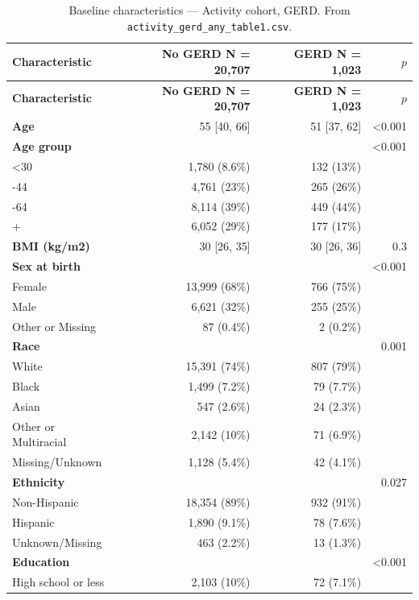 \documentclass[11pt]{article}
\newcommand{\code}[1]{\texttt{\small #1}}
\begin{document}
\footnotesize\begin{longtable}{@{}p{6.4cm}rrr@{}}
\caption{Baseline characteristics --- Activity cohort, GERD. From \code{activity\_gerd\_any\_table1.csv}.}\label{tab:appM-t1-activity-gerd-any}\\
\toprule \textbf{Characteristic} & \textbf{No GERD     N = 20,707} & \textbf{GERD     N = 1,023} & \textbf{$p$} \\ \midrule \endfirsthead
\toprule \textbf{Characteristic} & \textbf{No GERD     N = 20,707} & \textbf{GERD     N = 1,023} & \textbf{$p$} \\ \midrule \endhead
\textbf{Age} & 55 [40, 66] & 51 [37, 62] & <0.001 \\
\textbf{Age group} &  &  & <0.001 \\
\quad <30 & 1,780 (8.6\%) & 132 (13\%) &  \\
\quad 30-44 & 4,761 (23\%) & 265 (26\%) &  \\
\quad 45-64 & 8,114 (39\%) & 449 (44\%) &  \\
\quad 65+ & 6,052 (29\%) & 177 (17\%) &  \\
\textbf{BMI (kg/m2)} & 30 [26, 35] & 30 [26, 36] & 0.3 \\
\textbf{Sex at birth} &  &  & <0.001 \\
\quad Female & 13,999 (68\%) & 766 (75\%) &  \\
\quad Male & 6,621 (32\%) & 255 (25\%) &  \\
\quad Other or Missing & 87 (0.4\%) & 2 (0.2\%) &  \\
\textbf{Race} &  &  & 0.001 \\
\quad White & 15,391 (74\%) & 807 (79\%) &  \\
\quad Black & 1,499 (7.2\%) & 79 (7.7\%) &  \\
\quad Asian & 547 (2.6\%) & 24 (2.3\%) &  \\
\quad Other or Multiracial & 2,142 (10\%) & 71 (6.9\%) &  \\
\quad Missing/Unknown & 1,128 (5.4\%) & 42 (4.1\%) &  \\
\textbf{Ethnicity} &  &  & 0.027 \\
\quad Non-Hispanic & 18,354 (89\%) & 932 (91\%) &  \\
\quad Hispanic & 1,890 (9.1\%) & 78 (7.6\%) &  \\
\quad Unknown/Missing & 463 (2.2\%) & 13 (1.3\%) &  \\
\textbf{Education} &  &  & <0.001 \\
\quad High school or less & 2,103 (10\%) & 72 (7.1\%) &  \\

\end{longtable}
\end{document}
